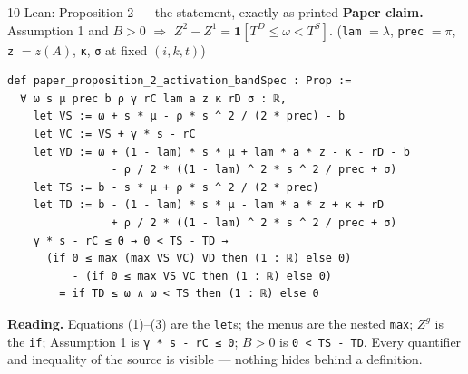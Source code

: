 \documentclass[aspectratio=169,11pt]{beamer}
\newcommand{\ind}{\mathbf 1}
\begin{document}
\begin{frame}[fragile]{10 \textperiodcentered{} Lean: Proposition 2 --- the statement, exactly as printed}
  \small\textbf{Paper claim.} Assumption 1 and $B>0$ $\Rightarrow$ $Z^2-Z^1=\ind[T^D\le\omega<T^S]$.
  \quad(\texttt{lam} $=\lambda$, \texttt{prec} $=\pi$, \texttt{z} $=z(A)$, \texttt{κ}, \texttt{σ} at fixed $(i,k,t)$)
\begin{lstlisting}
def paper_proposition_2_activation_bandSpec : Prop :=
  ∀ ω s μ prec b ρ γ rC lam a z κ rD σ : ℝ,
    let VS := ω + s * μ - ρ * s ^ 2 / (2 * prec) - b
    let VC := VS + γ * s - rC
    let VD := ω + (1 - lam) * s * μ + lam * a * z - κ - rD - b
                - ρ / 2 * ((1 - lam) ^ 2 * s ^ 2 / prec + σ)
    let TS := b - s * μ + ρ * s ^ 2 / (2 * prec)
    let TD := b - (1 - lam) * s * μ - lam * a * z + κ + rD
                + ρ / 2 * ((1 - lam) ^ 2 * s ^ 2 / prec + σ)
    γ * s - rC ≤ 0 → 0 < TS - TD →
      (if 0 ≤ max (max VS VC) VD then (1 : ℝ) else 0)
          - (if 0 ≤ max VS VC then (1 : ℝ) else 0)
        = if TD ≤ ω ∧ ω < TS then (1 : ℝ) else 0
\end{lstlisting}
  \textbf{Reading.} Equations (1)--(3) are the \texttt{let}s; the menus are the nested \texttt{max};
  $Z^g$ is the \texttt{if}; Assumption 1 is \texttt{γ * s - rC ≤ 0}; $B>0$ is \texttt{0 < TS - TD}.
  Every quantifier and inequality of the source is visible --- nothing hides behind a definition.
\end{frame}
\end{document}
